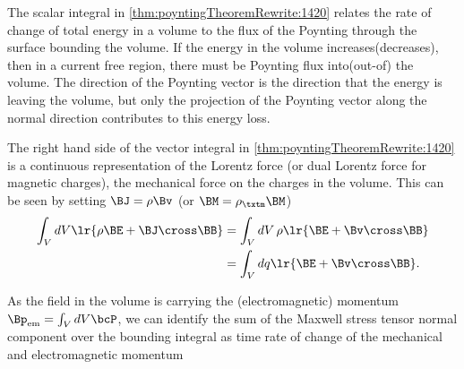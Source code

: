 The scalar integral in \cref{thm:poyntingTheoremRewrite:1420}
relates the rate of change of total energy in a volume to the flux of the Poynting through the surface bounding the volume.
If the energy in the volume increases(decreases), then in a current free region, there must be Poynting flux into(out-of) the volume.
The direction of the Poynting vector is the direction that the energy is leaving the volume, but only the projection of the Poynting vector along the normal direction contributes to this energy loss.

The right hand side of the vector integral in \cref{thm:poyntingTheoremRewrite:1420} is a continuous representation of the Lorentz force
(or dual Lorentz force for magnetic charges),
the mechanical force on the charges in the volume.  This can be seen by setting \( \BJ = \rho \Bv \) (or \( \BM = \rho_\txtm \BM \))
\begin{equation}\label{eqn:poyntingTheoremRewrite:1420}
\begin{aligned}
\int_V dV \lr{ \rho \BE + \BJ \cross \BB }
&= \int_V dV\, \rho \lr{ \BE + \Bv \cross \BB } \\
&= \int_V dq \lr{ \BE + \Bv \cross \BB }.
\end{aligned}
\end{equation}

As the field in the volume is carrying the (electromagnetic) momentum \( \Bp_{\textrm{em}} = \int_V dV \bcP \), we can identify the sum of the Maxwell stress tensor normal component over the bounding integral as time rate of change of the mechanical and electromagnetic momentum

